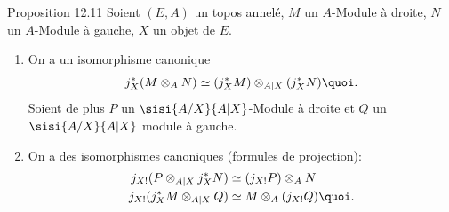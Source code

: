 \documentclass[10pt]{../fichiers-configuration-latex/smfart}
\begin{document}
\begin{enonce*}{Proposition 12.11}
Soient $(E,A)$ un topos annelé, $M$ un $A$-Module à droite, $N$ un
$A$-Module à gauche, $X$ un objet de $E$.
\begin{enumerate}
\renewcommand{\theenumi}{\alph{enumi}}
\renewcommand{\labelenumi}{\theenumi)}
\item On a un isomorphisme canonique
$$
j^{\ast}_X(M\otimes_A N)\simeq (j^{\ast}_XM)\otimes_{A|X}
(j^{\ast}_XN){\quoi}.
$$
Soient de plus $P$ un $\sisi{A/X}{A|X}$-Module à droite et $Q$ un $\sisi{A/X}{A|X}$ module à
gauche.

\item On a des isomorphismes canoniques (formules de projection):
\begin{align*}
j_{X!}(P\otimes_{A| X} j^{\ast}_XN) &\simeq (j_{X!}P)\otimes_A N\\
j_{X!}(j^{\ast}_XM\otimes_{A| X}Q) &\simeq M\otimes_A
(j_{X!}Q){\quoi}.
\end{align*}
\end{enumerate}
\end{enonce*}
\end{document}
